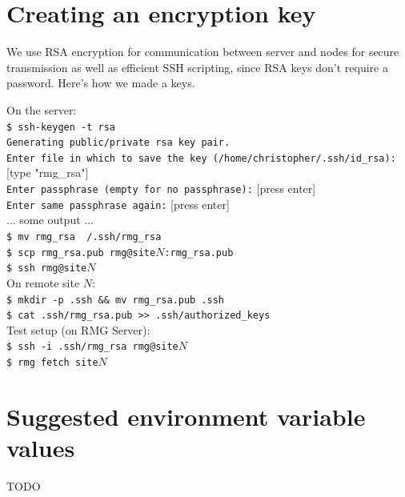 \documentclass[letter]{article}
\begin{document}
\begin{appendices}
\section{Creating an encryption key}
We use RSA encryption for communication between server and nodes for secure transmission
as well as efficient SSH scripting, since RSA keys don't require a password. 
Here's how we made a keys.

On the server:\\
\texttt{\$ ssh-keygen -t rsa}\\
\texttt{Generating public/private rsa key pair.}\\
\texttt{Enter file in which to save the key (/home/christopher/.ssh/id\_rsa):} [type "rmg\_rsa"]\\
\texttt{Enter passphrase (empty for no passphrase):} [press enter]\\
\texttt{Enter same passphrase again:} [press enter]\\
   ... some output ... \\
\texttt{\$ mv rmg\_rsa ~/.ssh/rmg\_rsa}\\
\texttt{\$ scp rmg\_rsa.pub rmg@site}$N$\texttt{:rmg\_rsa.pub}\\
\texttt{\$ ssh rmg@site}$N$\\

On remote site $N$:\\
\texttt{\$ mkdir -p .ssh \&\& mv rmg\_rsa.pub .ssh}\\
\texttt{\$ cat .ssh/rmg\_rsa.pub >> .ssh/authorized\_keys}\\

Test setup (on RMG Server):\\
\texttt{\$ ssh -i .ssh/rmg\_rsa rmg@site}$N$\\
\texttt{\$ rmg fetch site}$N$\\

\section{Suggested environment variable values}
TODO

\end{appendices}
\end{document}
